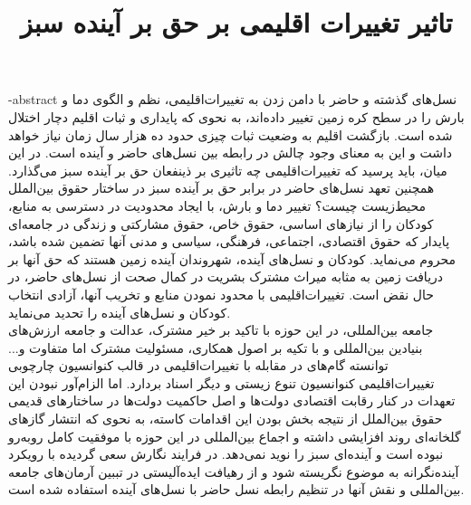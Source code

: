 \subject{دانشکده حقوق}
\title{تاثیر تغییرات اقلیمی بر حق بر آینده سبز}
\fa-abstract{\noindent
نسل‌های گذشته و حاضر با دامن زدن به تغییرات‌اقلیمی، نظم و الگوی دما و بارش را در سطح کره زمین تغییر داده‌اند، به نحوی که پایداری و ثبات اقلیم دچار اختلال شده است. بازگشت اقلیم به وضعیت ثبات چیزی حدود ده هزار سال زمان نیاز خواهد داشت و این به معنای وجود چالش در رابطه بین نسل‌های حاضر و آینده است. 
در این میان، باید پرسید که تغییرات‌اقلیمی چه تاثیری بر ذینفعان حق بر آینده سبز می‌گذارد. همچنین تعهد نسل‌های حاضر در برابر حق بر آینده سبز در ساختار حقوق بین‌الملل محیط‌زیست چیست؟
تغییر دما و بارش، با ایجاد محدودیت در دسترسی به منابع، کودکان را از نیاز‌های اساسی، حقوق خاص، حقوق مشارکتی  و زندگی در جامعه‌ای پایدار که حقوق اقتصادی، اجتماعی، فرهنگی، سیاسی و مدنی آنها تضمین شده باشد، محروم می‌نماید. کودکان و نسل‌های آینده، شهروندان آینده زمین هستند که حق آنها بر دریافت زمین به مثابه میراث مشترک بشریت در کمال صحت از نسل‌های حاضر، در حال نقض است. تغییرات‌اقلیمی با محدود نمودن منابع و تخریب آنها، آزادی انتخاب کودکان و نسل‌های آینده را تحدید می‌نماید.\\
جامعه بین‌المللی، در این حوزه با تاکید بر خیر مشترک، عدالت و جامعه ارزش‌های بنیادین بین‌المللی و با تکیه بر اصول همکاری، مسئولیت مشترک اما متفاوت و... توانسته گام‌های در مقابله با تغییرات‌اقلیمی در قالب کنوانسیون چارچوبی تغییرات‌اقلیمی کنوانسیون تنوع زیستی و دیگر اسناد بردارد. اما الزام‌آور نبودن این تعهدات در کنار رقابت اقتصادی دولت‌ها و اصل حاکمیت دولت‌ها در ساختار‌های قدیمی حقوق بین‌الملل از نتیجه بخش بودن این اقدامات کاسته، به نحوی که انتشار گاز‌های گلخانه‌ای روند افزایشی داشته و اجماع بین‌المللی در این حوزه با موفقیت کامل روبه‌رو نبوده است و آینده‌ای سبز را نوید نمی‌دهد. 
در فرایند نگارش سعی گردیده با رویکرد آینده‌نگرانه به موضوع نگریسته شود و از رهیافت ایده‌آلیستی در تببین آرمان‌های جامعه بین‌المللی و نقش آنها در تنظیم رابطه نسل حاضر با نسل‌های آینده استفاده شده است. }

